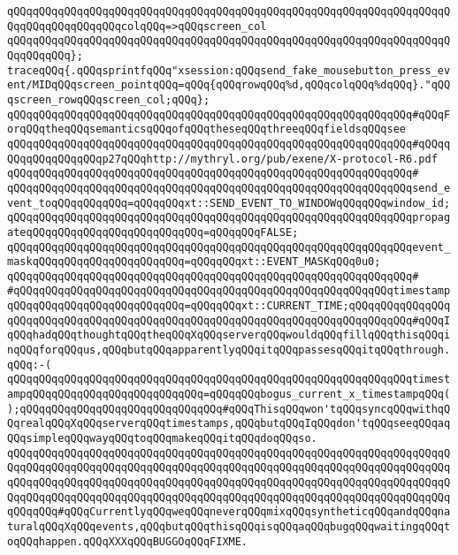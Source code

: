 \verb|qQQqqQQqqQQqqQQqqQQqqQQqqQQqqQQqqQQqqQQqqQQqqQQqqQQqqQQqqQQqqQQqqQQqqQQqqQQqqQQqqQQqqQQqcolqQQq=>qQQqscreen_col|\newline
\verb|qQQqqQQqqQQqqQQqqQQqqQQqqQQqqQQqqQQqqQQqqQQqqQQqqQQqqQQqqQQqqQQqqQQqqQQqqQQqqQQq};|\newline
\newline
\verb|traceqQQq{.qQQqsprintfqQQq"xsession:qQQqsend_fake_mousebutton_press_event/MIDqQQqscreen_pointqQQq=qQQq{qQQqrowqQQq%d,qQQqcolqQQq%dqQQq}."qQQqscreen_rowqQQqscreen_col;qQQq};|\newline
\verb|qQQqqQQqqQQqqQQqqQQqqQQqqQQqqQQqqQQqqQQqqQQqqQQqqQQqqQQqqQQqqQQq#qQQqForqQQqtheqQQqsemanticsqQQqofqQQqtheseqQQqthreeqQQqfieldsqQQqsee|\newline
\verb|qQQqqQQqqQQqqQQqqQQqqQQqqQQqqQQqqQQqqQQqqQQqqQQqqQQqqQQqqQQqqQQq#qQQqqQQqqQQqqQQqqQQqp27qQQqhttp://mythryl.org/pub/exene/X-protocol-R6.pdf|\newline
\verb|qQQqqQQqqQQqqQQqqQQqqQQqqQQqqQQqqQQqqQQqqQQqqQQqqQQqqQQqqQQqqQQq#|\newline
\verb|qQQqqQQqqQQqqQQqqQQqqQQqqQQqqQQqqQQqqQQqqQQqqQQqqQQqqQQqqQQqqQQqsend_event_toqQQqqQQqqQQq=qQQqqQQqxt::SEND_EVENT_TO_WINDOWqQQqqQQqwindow_id;|\newline
\verb|qQQqqQQqqQQqqQQqqQQqqQQqqQQqqQQqqQQqqQQqqQQqqQQqqQQqqQQqqQQqqQQqpropagateqQQqqQQqqQQqqQQqqQQqqQQqqQQq=qQQqqQQqFALSE;|\newline
\verb|qQQqqQQqqQQqqQQqqQQqqQQqqQQqqQQqqQQqqQQqqQQqqQQqqQQqqQQqqQQqqQQqevent_maskqQQqqQQqqQQqqQQqqQQqqQQq=qQQqqQQqxt::EVENT_MASKqQQq0u0;|\newline
\verb|qQQqqQQqqQQqqQQqqQQqqQQqqQQqqQQqqQQqqQQqqQQqqQQqqQQqqQQqqQQqqQQq#|\newline
\verb|#qQQqqQQqqQQqqQQqqQQqqQQqqQQqqQQqqQQqqQQqqQQqqQQqqQQqqQQqqQQqtimestampqQQqqQQqqQQqqQQqqQQqqQQqqQQq=qQQqqQQqxt::CURRENT_TIME;qQQqqQQqqQQqqQQqqQQqqQQqqQQqqQQqqQQqqQQqqQQqqQQqqQQqqQQqqQQqqQQqqQQqqQQqqQQqqQQq#qQQqIqQQqhadqQQqthoughtqQQqtheqQQqXqQQqserverqQQqwouldqQQqfillqQQqthisqQQqinqQQqforqQQqus,qQQqbutqQQqapparentlyqQQqitqQQqpassesqQQqitqQQqthrough.qQQq:-(|\newline
\verb|qQQqqQQqqQQqqQQqqQQqqQQqqQQqqQQqqQQqqQQqqQQqqQQqqQQqqQQqqQQqqQQqtimestampqQQqqQQqqQQqqQQqqQQqqQQqqQQq=qQQqqQQqbogus_current_x_timestampqQQq();qQQqqQQqqQQqqQQqqQQqqQQqqQQqqQQq#qQQqThisqQQqwon'tqQQqsyncqQQqwithqQQqrealqQQqXqQQqserverqQQqtimestamps,qQQqbutqQQqIqQQqdon'tqQQqseeqQQqaqQQqsimpleqQQqwayqQQqtoqQQqmakeqQQqitqQQqdoqQQqso.|\newline
\verb|qQQqqQQqqQQqqQQqqQQqqQQqqQQqqQQqqQQqqQQqqQQqqQQqqQQqqQQqqQQqqQQqqQQqqQQqqQQqqQQqqQQqqQQqqQQqqQQqqQQqqQQqqQQqqQQqqQQqqQQqqQQqqQQqqQQqqQQqqQQqqQQqqQQqqQQqqQQqqQQqqQQqqQQqqQQqqQQqqQQqqQQqqQQqqQQqqQQqqQQqqQQqqQQqqQQqqQQqqQQqqQQqqQQqqQQqqQQqqQQqqQQqqQQqqQQqqQQqqQQqqQQqqQQqqQQqqQQqqQQqqQQqqQQq#qQQqCurrentlyqQQqweqQQqneverqQQqmixqQQqsyntheticqQQqandqQQqnaturalqQQqXqQQqevents,qQQqbutqQQqthisqQQqisqQQqaqQQqbugqQQqwaitingqQQqtoqQQqhappen.qQQqXXXqQQqBUGGOqQQqFIXME.|\newline
